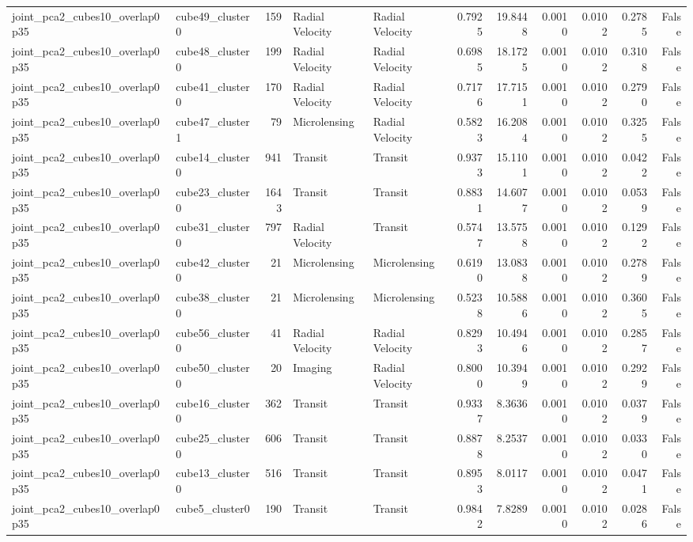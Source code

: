 \begin{table}[ht]
\begin{tabular}{llrllrrrrrr}
joint\_pca2\_cubes10\_overlap0p35 & cube49\_cluster0 & 159 & Radial Velocity & Radial Velocity & 0.7925 & 19.8448 & 0.0010 & 0.0102 & 0.2785 & False \\
joint\_pca2\_cubes10\_overlap0p35 & cube48\_cluster0 & 199 & Radial Velocity & Radial Velocity & 0.6985 & 18.1725 & 0.0010 & 0.0102 & 0.3108 & False \\
joint\_pca2\_cubes10\_overlap0p35 & cube41\_cluster0 & 170 & Radial Velocity & Radial Velocity & 0.7176 & 17.7151 & 0.0010 & 0.0102 & 0.2790 & False \\
joint\_pca2\_cubes10\_overlap0p35 & cube47\_cluster1 & 79 & Microlensing & Radial Velocity & 0.5823 & 16.2084 & 0.0010 & 0.0102 & 0.3255 & False \\
joint\_pca2\_cubes10\_overlap0p35 & cube14\_cluster0 & 941 & Transit & Transit & 0.9373 & 15.1101 & 0.0010 & 0.0102 & 0.0422 & False \\
joint\_pca2\_cubes10\_overlap0p35 & cube23\_cluster0 & 1643 & Transit & Transit & 0.8831 & 14.6077 & 0.0010 & 0.0102 & 0.0539 & False \\
joint\_pca2\_cubes10\_overlap0p35 & cube31\_cluster0 & 797 & Radial Velocity & Transit & 0.5747 & 13.5758 & 0.0010 & 0.0102 & 0.1292 & False \\
joint\_pca2\_cubes10\_overlap0p35 & cube42\_cluster0 & 21 & Microlensing & Microlensing & 0.6190 & 13.0838 & 0.0010 & 0.0102 & 0.2789 & False \\
joint\_pca2\_cubes10\_overlap0p35 & cube38\_cluster0 & 21 & Microlensing & Microlensing & 0.5238 & 10.5886 & 0.0010 & 0.0102 & 0.3605 & False \\
joint\_pca2\_cubes10\_overlap0p35 & cube56\_cluster0 & 41 & Radial Velocity & Radial Velocity & 0.8293 & 10.4946 & 0.0010 & 0.0102 & 0.2857 & False \\
joint\_pca2\_cubes10\_overlap0p35 & cube50\_cluster0 & 20 & Imaging & Radial Velocity & 0.8000 & 10.3949 & 0.0010 & 0.0102 & 0.2929 & False \\
joint\_pca2\_cubes10\_overlap0p35 & cube16\_cluster0 & 362 & Transit & Transit & 0.9337 & 8.3636 & 0.0010 & 0.0102 & 0.0379 & False \\
joint\_pca2\_cubes10\_overlap0p35 & cube25\_cluster0 & 606 & Transit & Transit & 0.8878 & 8.2537 & 0.0010 & 0.0102 & 0.0330 & False \\
joint\_pca2\_cubes10\_overlap0p35 & cube13\_cluster0 & 516 & Transit & Transit & 0.8953 & 8.0117 & 0.0010 & 0.0102 & 0.0471 & False \\
joint\_pca2\_cubes10\_overlap0p35 & cube5\_cluster0 & 190 & Transit & Transit & 0.9842 & 7.8289 & 0.0010 & 0.0102 & 0.0286 & False \\

\end{tabular}
\end{table}
